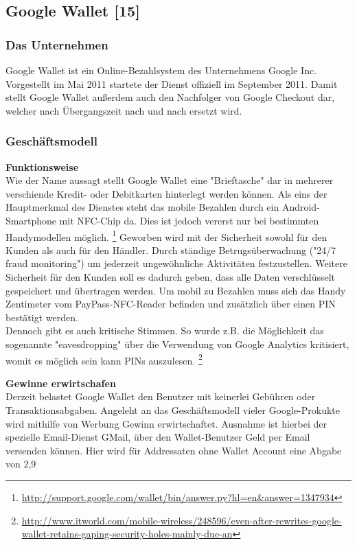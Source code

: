 \subsection{ Google Wallet [15]}
\subsubsection{ Das Unternehmen}
Google Wallet ist ein Online-Bezahlsystem des Unternehmens Google Inc. Vorgestellt im Mai 2011 startete der Dienst offiziell im September 2011.
Damit stellt Google Wallet außerdem auch den Nachfolger von Google Checkout dar, welcher nach Übergangszeit nach und nach ersetzt wird.

\subsubsection{ Geschäftsmodell}
\textbf{Funktionsweise}\\
Wie der Name aussagt stellt Google Wallet eine "Brieftasche" dar in mehrerer verschiende Kredit- oder Debitkarten hinterlegt werden können.
Als eins der Hauptmerkmal des Dienstes steht das mobile Bezahlen durch ein Android-Smartphone mit NFC-Chip da. Dies ist jedoch vererst nur bei bestimmten Handymodellen möglich. \footnote{\url{http://support.google.com/wallet/bin/answer.py?hl=en\&answer=1347934}}
Geworben wird mit der Sicherheit sowohl für den Kunden als auch für den Händler. Durch ständige Betrugsüberwachung ("24/7 fraud monitoring") um jederzeit ungewöhnliche Aktivitäten festzustellen. Weitere Sicherheit für den Kunden soll es dadurch geben, dass alle Daten verschlüsselt gespeichert und übertragen werden. Um mobil zu Bezahlen muss sich das Handy Zentimeter vom PayPass-NFC-Reader befinden und zusätzlich über einen PIN bestätigt werden.\\
Dennoch gibt es auch kritische Stimmen. So wurde z.B. die Möglichkeit das sogenannte "eavesdropping" über die Verwendung von Google Analytics kritisiert, womit es möglich sein kann PINs auszulesen.  \footnote{\url{http://www.itworld.com/mobile-wireless/248596/even-after-rewrites-google-wallet-retains-gaping-security-holes-mainly-due-an}}


\textbf{Gewinne erwirtschafen}\\
Derzeit belastet Google Wallet den Benutzer mit keinerlei Gebühren oder Transaktionsabgaben. Angeleht an das Geschäftsmodell vieler Google-Prokukte wird mithilfe von Werbung Gewinn erwirtschaftet.
Ausnahme ist hierbei der spezielle Email-Dienst GMail, über den Wallet-Benutzer Geld per Email versenden können. Hier wird für Addressaten ohne Wallet Account eine Abgabe von 2,9%

